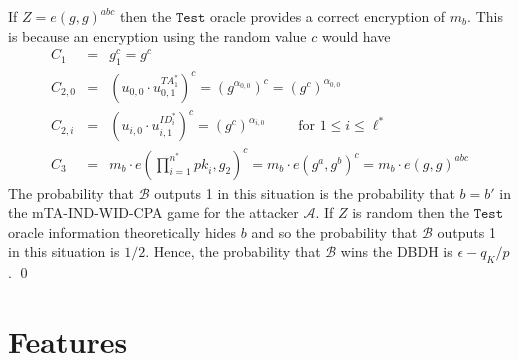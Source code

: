\documentclass[10pt]{llncs}
\newcommand{\A}{\mathcal{A}}
\newcommand{\B}{\mathcal{B}}
\newcommand{\ID}{\mathit{ID}}
\newcommand{\TA}{\mathit{TA}}
\newcommand{\pk}{\mathit{pk}}
\begin{document}
If $Z=e(g,g)^{abc}$ then the $\texttt{Test}$ oracle provides a correct encryption of $m_{b}$. This is because an encryption using the random value $c$ would have 
\begin{eqnarray*}
C_{1} &=& g_{1}^{c}=g^{c}\\
C_{2,0} &=& (u_{0,0} \cdot u_{0,1}^{\TA^{*}_{1}})^{c} = (g^{\alpha_{0,0}})^{c} = (g^{c})^{\alpha_{0,0}}\\
C_{2,i} &=& (u_{i,0} \cdot u_{i,1}^{\ID^{*}_{i}})^{c} = (g^{c})^{\alpha_{i,0}} \qquad \mbox{ for } 1\leq i\leq \ell^{*}\\
C_{3} &=& m_{b} \cdot e(\prod_{i=1}^{n^{*}} \pk_i,g_{2})^{c}
= m_{b} \cdot e(g^{a},g^{b})^{c} = m_{b} \cdot e(g,g)^{abc}
\end{eqnarray*}
The probability that $\B$ outputs 1 in this situation is the probability that $b=b'$ in the mTA-IND-WID-CPA game for the attacker $\A$. If $Z$ is random then the $\texttt{Test}$ oracle information theoretically hides $b$ and so the probability that $\B$ outputs 1 in this situation is $1/2$. Hence, the probability that $\B$ wins the DBDH is $\epsilon-q_{K}/p$. \qed

\section{Features}
\end{document}
